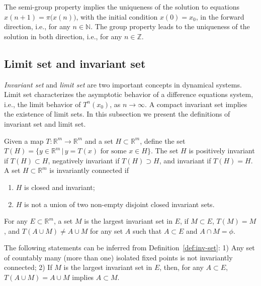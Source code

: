 \documentclass[10pt]{svmult}
\begin{document}
\begin{remark}
The semi-group property implies the uniqueness of the solution to equations $x(n+1)=\pi\big(x(n)\big)$, with the initial condition $x(0)=x_0$, in the forward direction, i.e., for any $n\in \mathbb{N}$. The group property leads to the uniqueness of the solution in both direction, i.e., for any $n\in \mathbb{Z}$.
\end{remark}

\subsection{Limit set and invariant set}
\emph{Invariant set} and \emph{limit set} are two important concepts in dynamical systems. Limit set characterizes the asymptotic behavior of a difference equations system, i.e., the limit behavior of $T^n(x_0)$, as $n\to \infty$. A compact invariant set implies the existence of limit sets. In this subsection we present the definitions of invariant set and limit set.

\begin{definition}\label{def:inv-set}
Given a map $T:\mathbb{R}^m \to \mathbb{R}^m$ and a set $H\subset \mathbb{R}^m$, define the set $T(H)=\{y\in \mathbb{R}^m\,|\,y=T(x)\text{ for some }x\in H\}$. The set $H$ is positively invariant if $T(H)\subset H$, negatively invariant if $T(H)\supset H$, and invariant if $T(H)=H$. A set $H\subset \mathbb{R}^m$ is invariantly connected if 
\begin{enumerate}[label={\arabic*)}]
\item $H$ is closed and invariant;
\item $H$ is not a union of two non-empty disjoint closed invariant sets.
\end{enumerate}
For any $E\subset \mathbb{R}^m$, a set $M$ is the largest invariant set in $E$, if $M\subset E$, $T(M)=M$, and $T(A\cup M)\neq A\cup M$ for any set $A$ such that $A\subset E$ and $A\cap M = \phi$.
\end{definition}

\begin{remark}\label{remark:inv-set-connected-largest} 
The following statements can be inferred from Definition~\ref{def:inv-set}: 1) Any set of countably many (more than one) isolated fixed points is not invariantly connected; 2) If $M$ is the largest invariant set in $E$, then, for any $A\subset E$, $T(A\cup M)=A\cup M$ implies $A\subset M$.
\end{remark}
\end{document}
